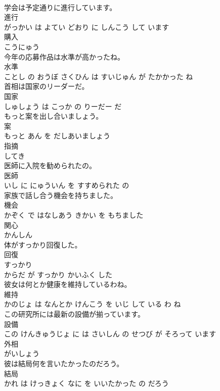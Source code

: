 \documentclass[8pt]{extreport}
\begin{document}
\begin{CJK}{UTF8}{min}
\\	学会は予定通りに進行しています。	
\\	進行 
\\	がっかい は よてい どおり に しんこう して います			
\\	購入	
\\	こうにゅう			
\\	今年の応募作品は水準が高かったね。	
\\	水準 
\\	ことし の おうぼ さくひん は すいじゅん が たかかった ね			
\\	首相は国家のリーダーだ。	
\\	国家 
\\	しゅしょう は こっか の りーだー だ			
\\	もっと案を出し合いましょう。	
\\	案 
\\	もっと あん を だしあいましょう			
\\	指摘	
\\	してき			
\\	医師に入院を勧められたの。	
\\	医師 
\\	いし に にゅういん を すすめられた の			
\\	家族で話し合う機会を持ちました。	
\\	機会 
\\	かぞく で はなしあう きかい を もちました			
\\	関心	
\\	かんしん			
\\	体がすっかり回復した。	
\\	回復 
\\	すっかり 
\\	からだ が すっかり かいふく した			
\\	彼女は何とか健康を維持しているわね。	
\\	維持 
\\	かのじょ は なんとか けんこう を いじ して いる わ ね			
\\	この研究所には最新の設備が揃っています。	
\\	設備 
\\	この けんきゅうじょ に は さいしん の せつび が そろって います			
\\	外相	
\\	がいしょう			
\\	彼は結局何を言いたかったのだろう。	
\\	結局 
\\	かれ は けっきょく なに を いいたかった の だろう			

\end{CJK}
\end{document}
